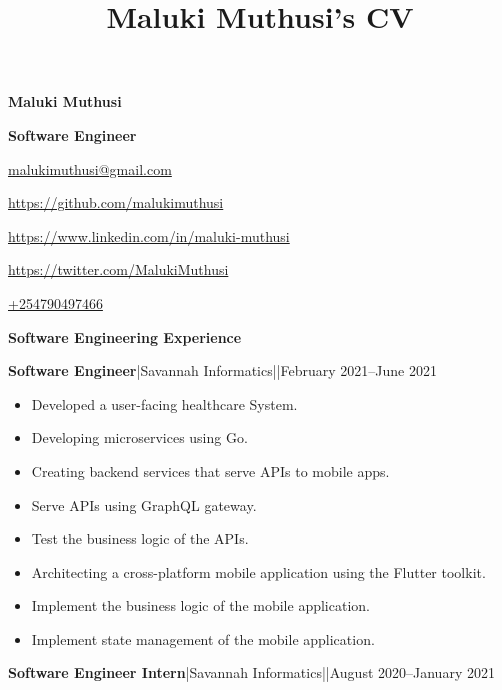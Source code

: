 \documentclass[a4paper]{article}
\begin{document}
\title{Maluki Muthusi's CV}

\begin{center}
    {\Large \textbf{Maluki Muthusi}} \par

    {\large \textbf{Software Engineer}}
\end{center}

\begin{description}[noitemsep]
    \item[\textbf{Email:}] \href{mailto:malukimuthusi@gmail.com}{malukimuthusi@gmail.com}
    \item[\textbf{Github:}] \url{https://github.com/malukimuthusi}
        \item[\textbf{LinkedIn:}]\url{https://www.linkedin.com/in/maluki-muthusi}
        \item[\textbf{Twitter:}]\url{https://twitter.com/MalukiMuthusi}
        \item[\textbf{Contact:}]\url{+254790497466}
\end{description}


\begin{center}
    {\Large \textbf{Software Engineering Experience}}
\end{center}

\textbf{Software Engineer}|Savannah Informatics||February 2021--June 2021

\begin{itemize}[noitemsep]
    \item Developed a user-facing healthcare System.
    \item Developing microservices using Go.
    \item Creating backend services that serve APIs to mobile apps.
    \item Serve APIs using GraphQL gateway.
    \item Test the business logic of the APIs.
    \item Architecting a cross-platform mobile application using the Flutter toolkit.
    \item Implement the business logic of the mobile application.
    \item Implement state management of the mobile application.

\end{itemize}


\textbf{Software Engineer Intern}|Savannah Informatics||August 2020--January 2021
\end{document}
